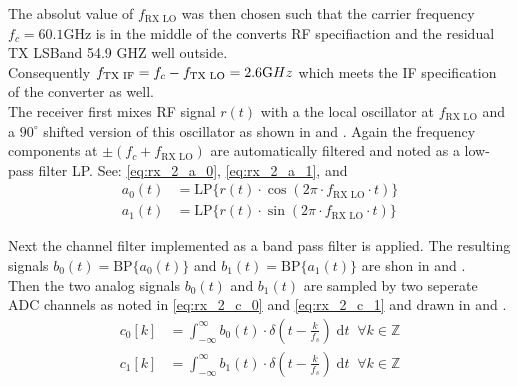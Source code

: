 The absolut value of $f_{\text{RX LO}}$ was then chosen such that the
carrier frequency $f_c = 60.1 \text{GHz}$ is in the middle of the
converts \gls{RF} specifiaction and the residual \gls{TX} \gls{LSBand}
54.9 GHZ well outside. \\

Consequently $f_{\text{TX IF}} = f_c - f_{\text{TX LO}} = 2.6 \text GHz$ which
meets the \gls{IF} specification of the converter as well. \\

The receiver first mixes \gls{RF} signal $r(t)$ with a the local oscillator
at $f_{\text{RX LO}}$ and a $90^\circ$ shifted version of this oscillator
as shown in  and .
Again the frequency components at $\pm (f_c + f_{\text{RX LO}})$ are
automatically filtered and noted as a low-pass filter LP.
See: \eqref{eq:rx_2_a_0}, \eqref{eq:rx_2_a_1},
 and  \\

\begin{subequations}
  \begin{alignat}{2}
    a_0(t) &= \text{LP}\{r(t) \cdot \cos(2\pi \cdot f_{\text{RX LO}} \cdot t)\}
    \label{eq:rx_2_a_0} \\
    a_1(t) &= \text{LP}\{r(t) \cdot \sin(2\pi \cdot f_{\text{RX LO}} \cdot t)\}
    \label{eq:rx_2_a_1}
  \end{alignat}
\end{subequations}

Next the channel filter implemented as a band pass filter is applied.
The resulting signals $b_0(t) = \text{BP}\{a_0(t)\}$ and
$b_1(t) = \text{BP}\{a_1(t)\}$ are shon in 
and . \\

Then the two analog signals $b_0(t)$ and $b_1(t)$ are sampled by two
seperate \gls{ADC} channels as noted in \eqref{eq:rx_2_c_0} and
\eqref{eq:rx_2_c_1} and drawn in 
and . \\

\begin{subequations}
  \begin{alignat}{2}
    c_0[k] &= \int_{-\infty}^{\infty}
    b_0(t) \cdot \delta\left(t - \frac{k}{f_s}\right) \; \text{d}t
    \;\; \forall k \in \mathbb{Z}
    \label{eq:rx_2_c_0} \\
    c_1[k] &= \int_{-\infty}^{\infty}
    b_1(t) \cdot \delta\left(t - \frac{k}{f_s}\right) \; \text{d}t
    \;\; \forall k \in \mathbb{Z}
    \label{eq:rx_2_c_1}
  \end{alignat}
\end{subequations}

